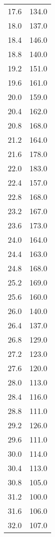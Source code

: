 \begin{longtable}{S[table-format=3.1] S[table-format=3.0]}
                17.6 & 134.0\\
                18.0 & 137.0\\
                18.4 & 146.0\\
                18.8 & 140.0\\
                19.2 & 151.0\\
                19.6 & 161.0\\
                20.0 & 159.0\\
                20.4 & 162.0\\
                20.8 & 168.0\\
                21.2 & 164.0\\
                21.6 & 178.0\\
                22.0 & 183.0\\
                22.4 & 157.0\\
                22.8 & 168.0\\
                23.2 & 167.0\\
                23.6 & 173.0\\
                24.0 & 164.0\\
                24.4 & 163.0\\
                24.8 & 168.0\\
                25.2 & 169.0\\
                25.6 & 160.0\\
                26.0 & 140.0\\
                26.4 & 137.0\\
                26.8 & 129.0\\
                27.2 & 123.0\\
                27.6 & 120.0\\
                28.0 & 113.0\\
                28.4 & 116.0\\
                28.8 & 111.0\\
                29.2 & 126.0\\
                29.6 & 111.0\\
                30.0 & 114.0\\
                30.4 & 113.0\\
                30.8 & 105.0\\
                31.2 & 100.0\\
                31.6 & 106.0\\
                32.0 & 107.0\\

\end{longtable}
